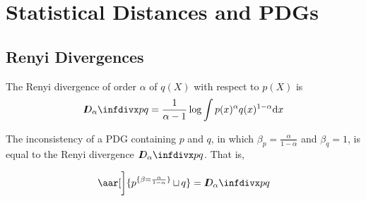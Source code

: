 \documentclass[the-pdg-manual.tex]{subfiles}
\begin{document}
    \section{Statistical Distances and PDGs}


    \subsection{Renyi Divergences}
    The Renyi divergence of order $\alpha$ of $q(X)$ with respect to $p(X)$ is
    \[ \Div[\alpha] p q = \frac1{\alpha -1}\log \int p(x)^\alpha q(x)^{1-\alpha} \mathrm dx \]

    \begin{prop}
        The inconsistency of a PDG containing $p$ and $q$, in which $\beta_p = \frac{\alpha}{1-\alpha}$ and $\beta_q = 1$, is equal to the Renyi divergence $\Div[\alpha]p q$.
        That is, 
        
        \[ \aar[\bigg]{p^{\{\beta=\frac{\alpha}{1-\alpha}\}} \bundle q} = \Div[\alpha]p q \]
    \end{prop}
\end{document}
